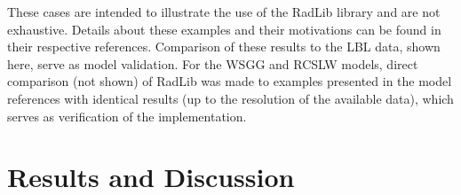 \documentclass[preprint,12pt]{elsarticle}
\begin{document}
    These cases are intended to illustrate the use of the RadLib library and are not exhaustive. Details about these
    examples and their motivations can be found in their respective references. Comparison of these results to the
    LBL data, shown here, serve as model validation. For the WSGG and RCSLW models, direct comparison (not shown) of
    RadLib was
    made to examples presented in the model references with identical results (up to the resolution of the available
    data), which serves as verification of the implementation.



    \section{Results and Discussion} \label{s:discussion}
\end{document}
